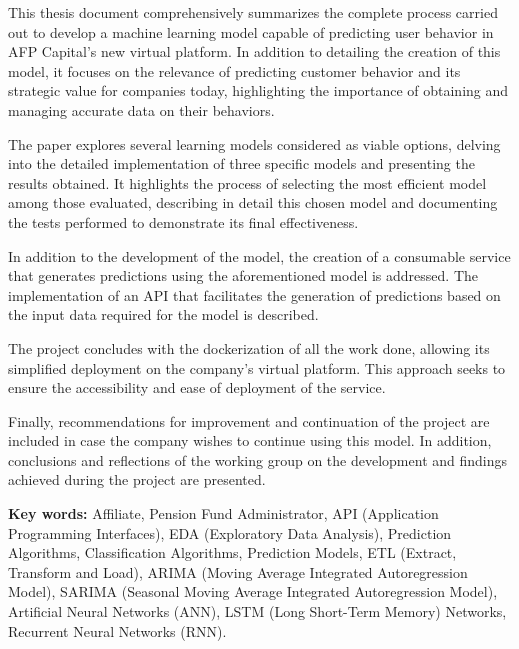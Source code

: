 This thesis document comprehensively summarizes the complete process carried out to develop a machine learning model capable of predicting user behavior in AFP Capital's new virtual platform. In addition to detailing the creation of this model, it focuses on the relevance of predicting customer behavior and its strategic value for companies today, highlighting the importance of obtaining and managing accurate data on their behaviors.

The paper explores several learning models considered as viable options, delving into the detailed implementation of three specific models and presenting the results obtained. It highlights the process of selecting the most efficient model among those evaluated, describing in detail this chosen model and documenting the tests performed to demonstrate its final effectiveness.

In addition to the development of the model, the creation of a consumable service that generates predictions using the aforementioned model is addressed. The implementation of an API that facilitates the generation of predictions based on the input data required for the model is described.

The project concludes with the dockerization of all the work done, allowing its simplified deployment on the company's virtual platform. This approach seeks to ensure the accessibility and ease of deployment of the service.

Finally, recommendations for improvement and continuation of the project are included in case the company wishes to continue using this model. In addition, conclusions and reflections of the working group on the development and findings achieved during the project are presented.

\textbf{Key words:}  Affiliate, Pension Fund Administrator, API (Application Programming Interfaces), EDA (Exploratory Data Analysis), Prediction Algorithms, Classification Algorithms, Prediction Models, ETL (Extract, Transform and Load), ARIMA (Moving Average Integrated Autoregression Model), SARIMA (Seasonal Moving Average Integrated Autoregression Model), Artificial Neural Networks (ANN), LSTM (Long Short-Term Memory) Networks, Recurrent Neural Networks (RNN).